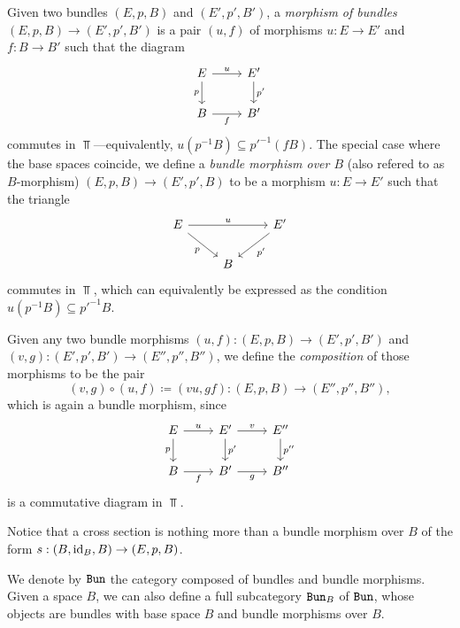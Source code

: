 \begin{definition}
\label{def:bundle-morphism}
Given two bundles \((E, p, B)\) and \((E', p', B')\), a \emph{morphism of
  bundles} \((E, p, B) \to (E', p', B')\) is a pair \((u, f)\) of morphisms
\(u: E \to E'\) and \(f: B \to B'\) such that the diagram
\[
\begin{tikzcd}
E \ar[r, "u"] \ar[d, "p"'] &E' \ar[d, "p'"] \\
B \ar[r, "f"'] &B'
\end{tikzcd}
\]
commutes in \(\Top\)---equivalently, \(u (p^{-1} B) \subseteq p'^{-1}(f
B)\). The special case where the base spaces coincide, we define a \emph{bundle
  morphism over \(B\)} (also refered to as \(B\)-morphism)
\((E, p, B) \to (E', p', B)\) to be a morphism \(u: E \to E'\) such that the
triangle
\[
\begin{tikzcd}
E \ar[rr, "u"] \ar[dr, "p"'] & &E' \ar[ld, "p'"] \\
&B &
\end{tikzcd}
\]
commutes in \(\Top\), which can equivalently be expressed as the condition
\(u (p^{-1} B) \subseteq p'^{-1} B\).

Given any two bundle morphisms \((u, f): (E, p, B) \to (E', p', B')\) and \((v,
g): (E', p', B') \to (E'', p'', B'')\), we define the \emph{composition} of
those morphisms to be the pair
\[
(v, g) \circ (u, f) \coloneq (v u, g f):
(E, p, B) \longrightarrow (E'', p'', B''),
\]
which is again a bundle morphism, since
\[
\begin{tikzcd}
E \ar[r, "u"] \ar[d, "p"']
&E' \ar[d, "p'"] \ar[r, "v"]
&E'' \ar[d, "p''"]
\\
B \ar[r, "f"']
&B' \ar[r, "g"']
&B''
\end{tikzcd}
\]
is a commutative diagram in \(\Top\).
\end{definition}

\begin{example}
\label{exp:cross-section-is-bundle-morphism}
Notice that a cross section is nothing more than a bundle morphism over \(B\) of
the form \(s: (B, \operatorname{id}_B, B) \to (E, p, B)\).
\end{example}

\begin{definition}
\label{def:category-of-bundles}
We denote by \({\texttt{Bun}}\) the category composed of bundles and bundle
morphisms. Given a space \(B\), we can also define a full subcategory \({\texttt{Bun}}_B\)
of \({\texttt{Bun}}\), whose objects are bundles with base space \(B\) and bundle
morphisms over \(B\).
\end{definition}

